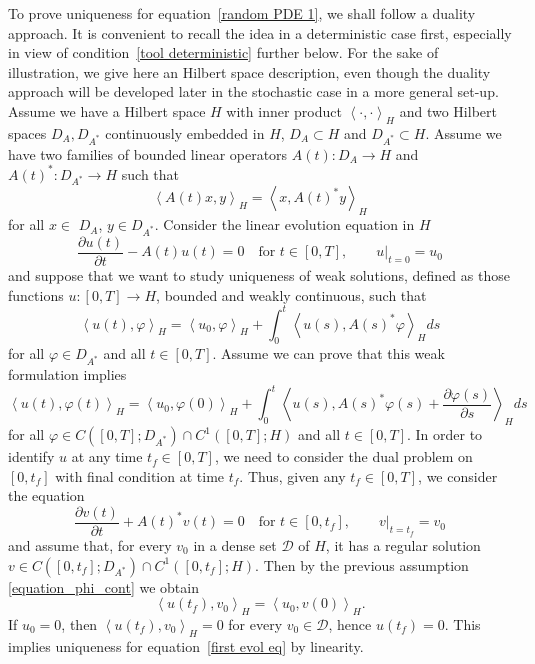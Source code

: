 \documentclass[a4paper,10pt]{article}
\begin{document}
To prove uniqueness for equation~\eqref{random PDE 1}, we shall follow a
duality approach. It is convenient to recall the idea in a deterministic case
first, especially in view of condition~\eqref{tool deterministic} further below. For the
sake of illustration, we give here an Hilbert space description, even though 
the duality approach will be developed later in the stochastic case in a more general
set-up. Assume we have a Hilbert space $H$ with inner product $\left\langle
\cdot,\cdot\right\rangle _{H}$ and two Hilbert spaces $D_{A}, D_{A^{\ast}}$ 
continuously embedded in $H$, $D_{A}\subset H$ and $D_{A^{\ast}}\subset H$. Assume we 
have two families of bounded linear operators $A(t) \colon D_{A}\rightarrow H$ and
$A(t)^{\ast} \colon D_{A^{\ast}} \rightarrow H$ such that
\[
\left\langle A(t)  x,y\right\rangle _{H}=\left\langle x,A(t)^{\ast}y\right\rangle _{H}
\]
for all $x\in$ $D_{A}$, $y\in D_{A^{\ast}}$. Consider the linear evolution
equation in $H$ 
\begin{equation}
\frac{\partial u(t)}{\partial t}-A(t)  u(t)   = 0 \quad \text{for }t\in [0,T], \label{first evol eq} \qquad
u|_{t=0}  =u_{0}
\end{equation}
and suppose that we want to study uniqueness of weak solutions, defined as those
functions $u \colon [0,T] \rightarrow H$, bounded and weakly
continuous, such that
\[
\left\langle u(t)  ,\varphi\right\rangle _{H}=\left\langle
u_{0},\varphi\right\rangle _{H}+\int_{0}^{t}\left\langle u(s)
,A(s)^{\ast}\varphi\right\rangle_{H}ds
\]
for all $\varphi\in D_{A^{\ast}}$ and all $t \in [0,T]$. Assume we can prove that this weak
formulation implies
\begin{equation}
\label{equation_phi_cont}
\left\langle u(t)  ,\varphi(t)  \right\rangle
_{H}=\left\langle u_{0},\varphi(0)  \right\rangle _{H}+\int_{0}^{t}\left\langle u(s)  ,A(s)^{\ast}
\varphi(s)  +\frac{\partial\varphi(s)}{\partial s}\right\rangle_{H}ds
\end{equation}
for all $\varphi\in C([0,T];D_{A^{\ast}}) \cap C^{1}([0,T];H)$ and all $t \in [0,T]$. In order to identify $u$ at any
time $t_{f}\in [0,T]$, we need to consider the dual problem on
$[0,t_{f}]$ with final condition at time $t_{f}$. Thus, given
any $t_{f}\in [0,T]$, we consider the equation
\begin{equation}
\frac{\partial v(t)}{\partial t}+A(t)^{\ast}v(t)  =0 \quad \text{for } t \in [0,t_{f}], \label{dual evol eq} 
\qquad v|_{t=t_{f}} = v_{0}
\end{equation}
and assume that, for every $v_{0}$ in a dense set $\mathcal{D}$ of $H$, it has
a regular solution $v\in C([0,t_{f}];D_{A^{\ast}}) \cap C^{1}([0,t_{f}];H)$. Then by the previous assumption \eqref{equation_phi_cont} we obtain
\[
\left\langle u(t_{f}) ,v_{0}\right\rangle_{H}=\left\langle
u_{0},v(0) \right\rangle_{H}.
\]
If $u_{0}=0$, then $\left\langle u(t_{f}) ,v_{0}\right\rangle
_{H}=0$ for every $v_{0}\in\mathcal{D}$, hence $u(t_{f}) =0$.
This implies uniqueness for equation~\eqref{first evol eq} by linearity.
\end{document}
